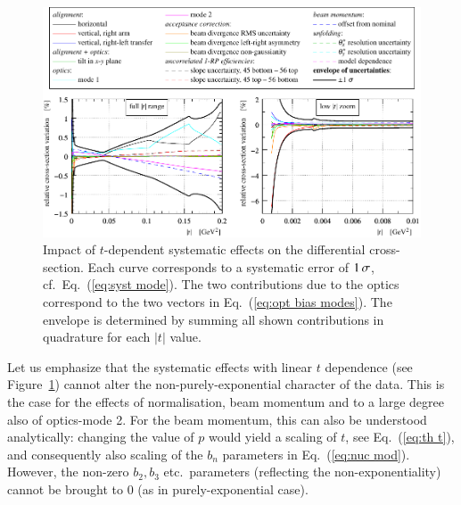 \begin{figure}
\begin{center}
\includegraphics{fig/systematic_uncertainties.pdf}
\caption{%
Impact of $t$-dependent systematic effects on the differential cross-section. Each curve corresponds to a systematic error of $1\,{\rm \sigma}$, cf.~Eq.~(\ref{eq:syst mode}). The two contributions due to the optics correspond to the two vectors in Eq.~(\ref{eq:opt bias modes}). The envelope is determined by summing all shown contributions in quadrature for each $|t|$ value.
}
\label{fig:syst unc}
\end{center}
\end{figure}

Let us emphasize that the systematic effects with linear $t$ dependence (see Figure~\ref{fig:syst unc}) cannot alter the non-purely-exponential character of the data. This is the case for the effects of normalisation, beam momentum and to a large degree also of optics-mode 2. For the beam momentum, this can also be understood analytically: changing the value of $p$ would yield a scaling of $t$, see Eq.~(\ref{eq:th t}), and consequently also scaling of the $b_n$ parameters in Eq.~(\ref{eq:nuc mod}). However, the non-zero $b_2, b_3$ etc.~parameters (reflecting the non-exponentiality) cannot be brought to $0$ (as in purely-exponential case).
